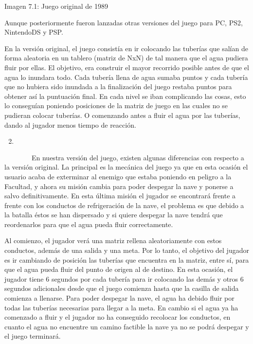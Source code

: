 \documentclass[]{article}
\begin{document}
Imagen 7.1: Juego original de 1989

Aunque posteriormente fueron lanzadas otras versiones del juego para PC,
PS2, NintendoDS y PSP.

En la versión original, el juego consistía en ir colocando las tuberías
que salían de forma aleatoria en un tablero (matriz de NxN) de tal
manera que el agua pudiera fluir por ellas. El objetivo, era construir
el mayor recorrido posible antes de que el agua lo inundara todo. Cada
tubería llena de agua sumaba puntos y cada tubería que no hubiera sido
inundada a la finalización del juego restaba puntos para obtener así la
puntuación final. En cada nivel se iban complicando las cosas, esto lo
conseguían poniendo posiciones de la matriz de juego en las cuales no se
pudieran colocar tuberías. O comenzando antes a fluir el agua por las
tuberías, dando al jugador menos tiempo de reacción.

\begin{enumerate}
\setcounter{enumi}{1}
\item
\end{enumerate}

~~~~~~~~En nuestra versión del juego, existen algunas diferencias con
respecto a la versión original. La principal es la mecánica del juego ya
que en esta ocasión el usuario acaba de exterminar al enemigo que estaba
poniendo en peligro a la Facultad, y ahora su misión cambia para poder
despegar la nave y ponerse a salvo definitivamente. En esta última
misión el jugador se encontrará frente a frente con los conductos de
refrigeración de la nave, el problema es que debido a la batalla éstos
se han dispersado y si quiere despegar la nave tendrá que reordenarlos
para que el agua pueda fluir correctamente.

Al comienzo, el jugador verá una matriz rellena aleatoriamente con estos
conductos, además de una salida y una meta. Por lo tanto, el objetivo
del jugador es ir cambiando de posición las tuberías que encuentra en la
matriz, entre sí, para que el agua pueda fluir del punto de origen al de
destino. En esta ocasión, el jugador tiene 6 segundos por cada tubería
para ir colocando las demás y otros 6 segundos adicionales desde que el
juego comienza hasta que la casilla de salida comienza a llenarse. Para
poder despegar la nave, el agua ha debido fluir por todas las tuberías
necesarias para llegar a la meta. En cambio si el agua ya ha comenzado a
fluir y el jugador no ha conseguido recolocar los conductos, en cuanto
el agua no encuentre un camino factible la nave ya no se podrá despegar
y el juego terminará.
\end{document}
